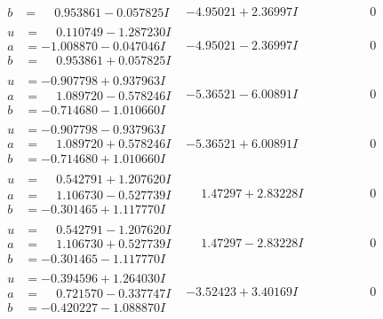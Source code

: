 \documentclass[1p]{elsarticle_modified}
\theoremstyle{definition}
\begin{document}
$$\begin{array}{c|c|c}
\begin{aligned}
b &= \phantom{-}0.953861 - 0.057825 I\end{aligned}
 & -4.95021 + 2.36997 I & \phantom{-0.000000 } 0 \\ \hline\begin{aligned}
u &= \phantom{-}0.110749 - 1.287230 I \\
a &= -1.008870 - 0.047046 I \\
b &= \phantom{-}0.953861 + 0.057825 I\end{aligned}
 & -4.95021 - 2.36997 I & \phantom{-0.000000 } 0 \\ \hline\begin{aligned}
u &= -0.907798 + 0.937963 I \\
a &= \phantom{-}1.089720 - 0.578246 I \\
b &= -0.714680 - 1.010660 I\end{aligned}
 & -5.36521 - 6.00891 I & \phantom{-0.000000 } 0 \\ \hline\begin{aligned}
u &= -0.907798 - 0.937963 I \\
a &= \phantom{-}1.089720 + 0.578246 I \\
b &= -0.714680 + 1.010660 I\end{aligned}
 & -5.36521 + 6.00891 I & \phantom{-0.000000 } 0 \\ \hline\begin{aligned}
u &= \phantom{-}0.542791 + 1.207620 I \\
a &= \phantom{-}1.106730 - 0.527739 I \\
b &= -0.301465 + 1.117770 I\end{aligned}
 & \phantom{-}1.47297 + 2.83228 I & \phantom{-0.000000 } 0 \\ \hline\begin{aligned}
u &= \phantom{-}0.542791 - 1.207620 I \\
a &= \phantom{-}1.106730 + 0.527739 I \\
b &= -0.301465 - 1.117770 I\end{aligned}
 & \phantom{-}1.47297 - 2.83228 I & \phantom{-0.000000 } 0 \\ \hline\begin{aligned}
u &= -0.394596 + 1.264030 I \\
a &= \phantom{-}0.721570 - 0.337747 I \\
b &= -0.420227 - 1.088870 I\end{aligned}
 & -3.52423 + 3.40169 I & \phantom{-0.000000 } 0 \\ \hline\begin{aligned}

\end{aligned}
\end{array}$$
\end{document}
